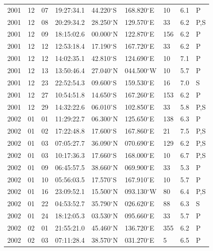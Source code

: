 \documentclass[12pt,twoside]{article}
\begin{document}
\begin{longtable}{|l|l|l|l|l|l|l|l|l|}
2001 & 12 & 07 & 19:27:34.1 & 44.220$^{\circ}$S  & 168.820$^{\circ}$E &  10 & 6.1 & P   \\
2001 & 12 & 08 & 20:29:34.2 & 28.250$^{\circ}$N & 129.570$^{\circ}$E &  33 & 6.2 & P,S \\
2001 & 12 & 09 & 18:15:02.6 & 00.000$^{\circ}$N & 122.870$^{\circ}$E & 156 & 6.2 & P   \\
2001 & 12 & 12 & 12:53:18.4 & 17.190$^{\circ}$S  & 167.720$^{\circ}$E &  33 & 6.2 & P   \\
2001 & 12 & 12 & 14:02:35.1 & 42.810$^{\circ}$S  & 124.690$^{\circ}$E &  10 & 7.1 & P   \\
2001 & 12 & 13 & 13:50:46.4 & 27.040$^{\circ}$N & 044.500$^{\circ}$W &  10 & 5.7 & P   \\
2001 & 12 & 23 & 22:52:54.3 & 09.600$^{\circ}$S  & 159.530$^{\circ}$E &  16 & 7.0 & S   \\     
2001 & 12 & 27 & 10:54:51.8 & 14.650$^{\circ}$S  & 167.260$^{\circ}$E & 153 & 6.2 & P   \\
2001 & 12 & 29 & 14:32:22.6 & 06.010$^{\circ}$S  & 102.850$^{\circ}$E &  33 & 5.8 & P,S \\
2002 & 01 & 01 & 11:29:22.7 & 06.300$^{\circ}$N & 125.650$^{\circ}$E & 138 & 6.3 & P   \\
2002 & 01 & 02 & 17:22:48.8 & 17.600$^{\circ}$S  & 167.860$^{\circ}$E &  21 & 7.5 & P,S \\
2002 & 01 & 03 & 07:05:27.7 & 36.090$^{\circ}$N & 070.690$^{\circ}$E & 129 & 6.2 & P,S \\
2002 & 01 & 03 & 10:17:36.3 & 17.660$^{\circ}$S  & 168.000$^{\circ}$E &  10 & 6.7 & P,S \\
2002 & 01 & 09 & 06:45:57.5 & 38.660$^{\circ}$N & 069.900$^{\circ}$E &  33 & 5.3 & P   \\
2002 & 01 & 10 & 05:56:03.5 & 17.570$^{\circ}$S  & 167.910$^{\circ}$E &  10 & 5.7 & P   \\
2002 & 01 & 16 & 23:09:52.1 & 15.500$^{\circ}$N & 093.130$^{\circ}$W &  80 & 6.4 & P,S \\
2002 & 01 & 22 & 04:53:52.7 & 35.790$^{\circ}$N & 026.620$^{\circ}$E &  88 & 6.3 & S   \\    
2002 & 01 & 24 & 18:12:05.3 & 03.530$^{\circ}$N & 095.660$^{\circ}$E &  33 & 5.7 & P   \\
2002 & 02 & 01 & 21:55:21.0 & 45.460$^{\circ}$N & 136.720$^{\circ}$E & 355 & 6.2 & P   \\
2002 & 02 & 03 & 07:11:28.4 & 38.570$^{\circ}$N & 031.270$^{\circ}$E &   5 & 6.5 & P   \\

\end{longtable}
\end{document}
